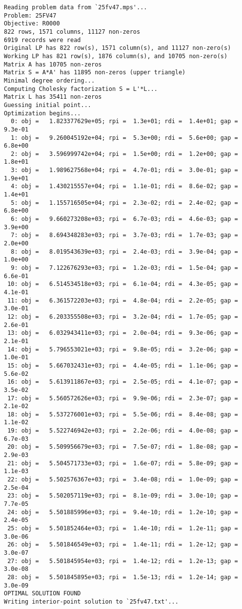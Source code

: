 \begin{footnotesize}
\begin{verbatim}
Reading problem data from `25fv47.mps'...
Problem: 25FV47
Objective: R0000
822 rows, 1571 columns, 11127 non-zeros
6919 records were read
Original LP has 822 row(s), 1571 column(s), and 11127 non-zero(s)
Working LP has 821 row(s), 1876 column(s), and 10705 non-zero(s)
Matrix A has 10705 non-zeros
Matrix S = A*A' has 11895 non-zeros (upper triangle)
Minimal degree ordering...
Computing Cholesky factorization S = L'*L...
Matrix L has 35411 non-zeros
Guessing initial point...
Optimization begins...
  0: obj =   1.823377629e+05; rpi =  1.3e+01; rdi =  1.4e+01; gap =  9.3e-01
  1: obj =   9.260045192e+04; rpi =  5.3e+00; rdi =  5.6e+00; gap =  6.8e+00
  2: obj =   3.596999742e+04; rpi =  1.5e+00; rdi =  1.2e+00; gap =  1.8e+01
  3: obj =   1.989627568e+04; rpi =  4.7e-01; rdi =  3.0e-01; gap =  1.9e+01
  4: obj =   1.430215557e+04; rpi =  1.1e-01; rdi =  8.6e-02; gap =  1.4e+01
  5: obj =   1.155716505e+04; rpi =  2.3e-02; rdi =  2.4e-02; gap =  6.8e+00
  6: obj =   9.660273208e+03; rpi =  6.7e-03; rdi =  4.6e-03; gap =  3.9e+00
  7: obj =   8.694348283e+03; rpi =  3.7e-03; rdi =  1.7e-03; gap =  2.0e+00
  8: obj =   8.019543639e+03; rpi =  2.4e-03; rdi =  3.9e-04; gap =  1.0e+00
  9: obj =   7.122676293e+03; rpi =  1.2e-03; rdi =  1.5e-04; gap =  6.6e-01
 10: obj =   6.514534518e+03; rpi =  6.1e-04; rdi =  4.3e-05; gap =  4.1e-01
 11: obj =   6.361572203e+03; rpi =  4.8e-04; rdi =  2.2e-05; gap =  3.0e-01
 12: obj =   6.203355508e+03; rpi =  3.2e-04; rdi =  1.7e-05; gap =  2.6e-01
 13: obj =   6.032943411e+03; rpi =  2.0e-04; rdi =  9.3e-06; gap =  2.1e-01
 14: obj =   5.796553021e+03; rpi =  9.8e-05; rdi =  3.2e-06; gap =  1.0e-01
 15: obj =   5.667032431e+03; rpi =  4.4e-05; rdi =  1.1e-06; gap =  5.6e-02
 16: obj =   5.613911867e+03; rpi =  2.5e-05; rdi =  4.1e-07; gap =  3.5e-02
 17: obj =   5.560572626e+03; rpi =  9.9e-06; rdi =  2.3e-07; gap =  2.1e-02
 18: obj =   5.537276001e+03; rpi =  5.5e-06; rdi =  8.4e-08; gap =  1.1e-02
 19: obj =   5.522746942e+03; rpi =  2.2e-06; rdi =  4.0e-08; gap =  6.7e-03
 20: obj =   5.509956679e+03; rpi =  7.5e-07; rdi =  1.8e-08; gap =  2.9e-03
 21: obj =   5.504571733e+03; rpi =  1.6e-07; rdi =  5.8e-09; gap =  1.1e-03
 22: obj =   5.502576367e+03; rpi =  3.4e-08; rdi =  1.0e-09; gap =  2.5e-04
 23: obj =   5.502057119e+03; rpi =  8.1e-09; rdi =  3.0e-10; gap =  7.7e-05
 24: obj =   5.501885996e+03; rpi =  9.4e-10; rdi =  1.2e-10; gap =  2.4e-05
 25: obj =   5.501852464e+03; rpi =  1.4e-10; rdi =  1.2e-11; gap =  3.0e-06
 26: obj =   5.501846549e+03; rpi =  1.4e-11; rdi =  1.2e-12; gap =  3.0e-07
 27: obj =   5.501845954e+03; rpi =  1.4e-12; rdi =  1.2e-13; gap =  3.0e-08
 28: obj =   5.501845895e+03; rpi =  1.5e-13; rdi =  1.2e-14; gap =  3.0e-09
OPTIMAL SOLUTION FOUND
Writing interior-point solution to `25fv47.txt'...
\end{verbatim}
\end{footnotesize}

